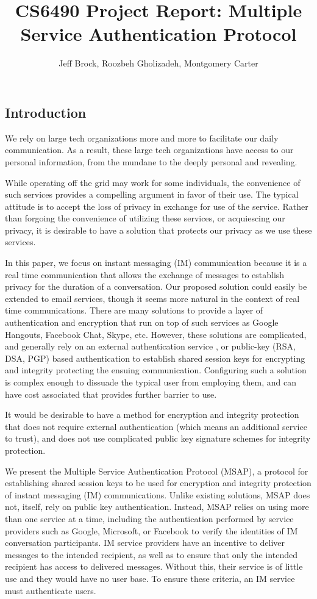 \documentclass[twoside,10pt]{article}
\title{CS6490 Project Report: Multiple Service Authentication Protocol}
\author{Jeff Brock, Roozbeh Gholizadeh, Montgomery Carter}
\date{}
\begin{document}
\maketitle
\newpage
\begin{multicols}{2}

\section{Introduction}
We rely on large tech organizations more and more to facilitate our daily communication.  As a result, these large tech organizations have access to our personal information, from the mundane to the deeply personal and revealing.

While operating off the grid may work for some individuals, the convenience of such services provides a compelling argument in favor of their use.  The typical attitude is to accept the loss of privacy in exchange for use of the service.  Rather than forgoing the convenience of utilizing these services, or acquiescing our privacy, it is desirable to have a solution that protects our privacy as we use these services.

In this paper, we focus on instant messaging (IM) communication because it is a real time communication that allows the exchange of messages to establish privacy for the duration of a conversation.  Our proposed solution could easily be extended to email services, though it seems more natural in the context of real time communications.  There are many solutions to provide a layer of authentication and encryption that run on top of such services as Google Hangouts, Facebook Chat, Skype, etc.  However, these solutions are complicated, and generally rely on an external authentication service \cite{DiRaimondo:2005:SOM:1102199.1102216}, or public-key (RSA, DSA, PGP) based authentication to establish shared session keys for encrypting and integrity protecting the ensuing communication.  Configuring such a solution is complex enough to dissuade the typical user from employing them, and can have cost associated that provides further barrier to use.

It would be desirable to have a method for encryption and integrity protection that does not require external authentication (which means an additional service to trust), and does not use complicated public key signature schemes for integrity protection.

We present the Multiple Service Authentication Protocol (MSAP), a protocol for establishing shared session keys to be used for encryption and integrity protection of instant messaging (IM) communications. Unlike existing solutions, MSAP does not, itself, rely on public key authentication.  Instead, MSAP relies on using more than one service at a time, including the authentication performed by service providers such as Google, Microsoft, or Facebook to verify the identities of IM conversation participants.  IM service providers have an incentive to deliver messages to the intended recipient, as well as to ensure that only the intended recipient has access to delivered messages.  Without this, their service is of little use and they would have no user base.  To ensure these criteria, an IM service must authenticate users.


\end{multicols}
\end{document}

